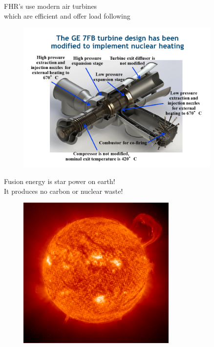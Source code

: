 \documentclass{beamer}
\begin{document}
        \begin{frame}{FHR's use modern air turbines \\ which are efficient and offer load following}
            \begin{figure}
                \centering
                \includegraphics[width=0.9\textwidth]{./img/fhrPower.png}
                \caption*{}
            \end{figure}
        \end{frame}

        \begin{frame}{Fusion energy is star power on earth! \\ It produces no carbon or nuclear waste!}
            \begin{figure}
                \centering
                \includegraphics[width=0.7\textwidth]{./img/theSun.jpg}
                \caption*{}
            \end{figure}
        \end{frame}
\end{document}
